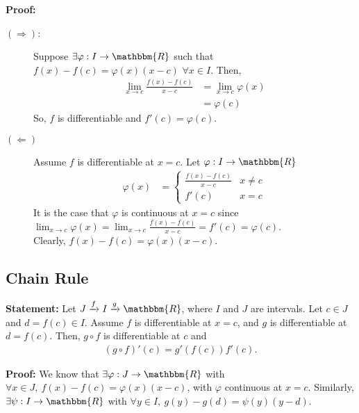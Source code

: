 \documentclass[10pt]{extarticle}
\newcommand{\R}{\mathbbm{R}}
\begin{document}
    \textbf{Proof:} 
    \begin{description}
      \item[$(\Rightarrow)$:] Suppose $\exists \varphi: I\rightarrow \R$ such that $f(x) - f(c) = \varphi(x)(x-c)$ $\forall x\in I$. Then,
        \begin{align*}
          \lim_{x\rightarrow c}\frac{f(x) - f(c)}{x-c} &= \lim_{x\rightarrow c} \varphi(x)\\
                                                       &= \varphi(c)
        \end{align*}
        So, $f$ is differentiable and $f'(c) = \varphi(c)$.
      \item[$(\Leftarrow)$] Assume $f$ is differentiable at $x=c$. Let $\varphi: I\rightarrow \R$
        \begin{align*}
          \varphi(x) &= \begin{cases}
            \frac{f(x) - f(c)}{x-c} & x\neq c\\
            f'(c) & x = c
          \end{cases}
        \end{align*}
        It is the case that $\varphi$ is continuous at $x=c$ since $\lim_{x\rightarrow c}\varphi(x) = \lim_{x\rightarrow c}\frac{f(x) - f(c)}{x-c} = f'(c) = \varphi(c)$.\\

        Clearly, $f(x) - f(c) = \varphi(x) (x-c)$.
    \end{description}
  \subsection{Chain Rule}%
    \textbf{Statement:} Let $J\xrightarrow{f} I \xrightarrow{g} \R$, where $I$ and $J$ are intervals. Let $c\in J$ and $d = f(c)\in I$. Assume $f$ is differentiable at $x=c$, and $g$ is differentiable at $d = f(c)$. Then, $g\circ f$ is differentiable at $c$ and
    \begin{align*}
      (g\circ f)'(c) = g'(f(c))f'(c).
    \end{align*}

    \textbf{Proof:} We know that $\exists \varphi: J\rightarrow \R$ with $\forall x\in J,~f(x)-f(c) = \varphi(x)(x-c)$, with $\varphi$ continuous at $x=c$. Similarly, $\exists \psi: I\rightarrow \R$ with $\forall y\in I,~g(y)-g(d) = \psi(y)(y-d)$.\\
\end{document}
